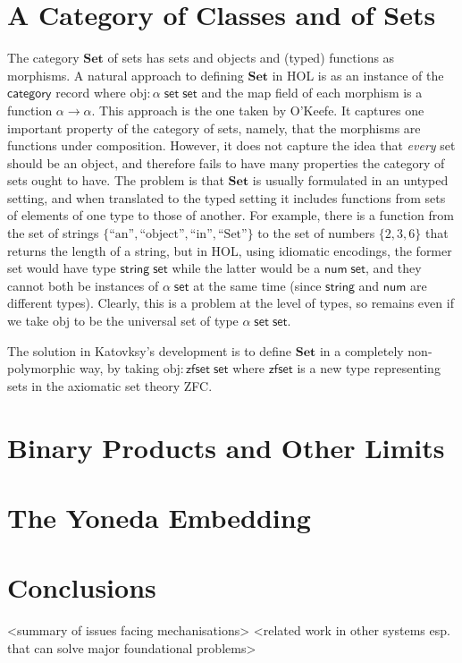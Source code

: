 \documentclass[twoside,titlepage,11pt]{article}
\begin{document}
\section{A Category of Classes and of Sets}%
\newcommand{\Set}{\ensuremath{\mathbf{Set}}}
The category $\Set$ of sets has sets and objects and (typed) functions as morphisms.
A natural approach to defining $\Set$ in HOL is as an instance of the $\mathsf{category}$ record where $\mathrm{obj}:\alpha\;\mathsf{set}\;\mathsf{set}$ and the map field of each morphism is a function $\alpha\to\alpha$.
This approach is the one taken by O'Keefe.
It captures one important property of the category of sets, namely, that the morphisms are functions under composition.
However, it does not capture the idea that \emph{every} set should be an object, and therefore fails to have many properties the category of sets ought to have.
The problem is that $\Set$ is usually formulated in an untyped setting, and when translated to the typed setting it includes functions from sets of elements of one type to those of another.
For example, there is a function from the set of strings $\{\text{``an''},\text{``object''},\text{``in''},\text{``Set''}\}$ to the set of numbers $\{2,3,6\}$ that returns the length of a string, but in HOL, using idiomatic encodings, the former set would have type $\mathsf{string}\;\mathsf{set}$ while the latter would be a $\mathsf{num}\;\mathsf{set}$, and they cannot both be instances of $\alpha\;\mathsf{set}$ at the same time (since $\mathsf{string}$ and $\mathsf{num}$ are different types).
Clearly, this is a problem at the level of types, so remains even if we take $\mathrm{obj}$ to be the universal set of type $\alpha\;\mathsf{set}\;\mathsf{set}$.

The solution in Katovksy's development is to define $\Set$ in a completely non-polymorphic way, by taking $\mathrm{obj}:\mathsf{zfset}\;\mathsf{set}$ where $\mathsf{zfset}$ is a new type representing sets in the axiomatic set theory ZFC.
\section{Binary Products and Other Limits}%
\section{The Yoneda Embedding}%
\section{Conclusions}%
<summary of issues facing mechanisations>
<related work in other systems esp. that can solve major foundational problems>


\end{document}
